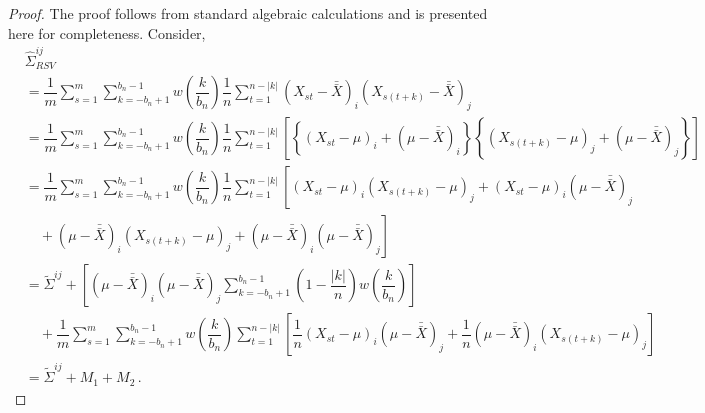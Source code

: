 \documentclass[11pt]{article}
\theoremstyle{remark}
\begin{document}
\begin{proof}
The proof follows from standard algebraic calculations and is presented here for completeness. Consider,
\begin{align*}
&\hat{\Sigma}_{RSV}^{ij} \\
&= \dfrac{1}{m}\sum_{s=1}^{m} \sum_{k=-b_n+1}^{b_n-1}w\left(\dfrac{k}{b_n}\right)\dfrac{1}{n}\sum_{t=1}^{n-|k|} \left(X_{st}-\bar{\bar{X}} \right)_i \left(X_{s(t+k)}-\bar{\bar{X}} \right)_j\\
&= \dfrac{1}{m}\sum_{s=1}^{m}\sum_{k=-b_n+1}^{b_n-1}w\left(\dfrac{k}{b_n}\right)\dfrac{1}{n}\sum_{t=1}^{n-|k|} \left[  \left\{\left(X_{st}-\mu \right)_i + \left(\mu-\bar{\bar{X}} \right)_i \right \}  \left\{ \left(X_{s(t+k)}-\mu \right)_j + \left(\mu-\bar{\bar{X}} \right)_j \right \} \right]\\
&= \dfrac{1}{m}\sum_{s=1}^{m}\sum_{k=-b_n+1}^{b_n-1}w\left(\dfrac{k}{b_n}\right)\dfrac{1}{n}\sum_{t=1}^{n-|k|}  \left[ \left(X_{st}-\mu \right)_i  \left(X_{s(t+k)}-\mu \right)_j+  \left(X_{st} - \mu \right)_i    \left(\mu - \bar{\bar{X}} \right)_j \right. \\  
& \quad + \left. \left(\mu-\bar{\bar{X}} \right)_i  \left(X_{s(t+k)}-\mu \right)_j + \left(\mu-\bar{\bar{X}} \right)_i  \left(\mu-\bar{\bar{X}}  \right)_j  \right]\\
& = \tilde{\Sigma}^{ij} + \left[(\mu-\bar{\bar{X}})_i(\mu-\bar{\bar{X}})_j\sum_{k=-b_n+1}^{b_n-1}\left(1-\dfrac{|k|}{n}\right)w\left(\dfrac{k}{b_n}\right)\right] \\ 
& \quad  + \dfrac{1}{m}\sum_{s=1}^{m}\sum_{k=-b_n+1}^{b_n-1}  w\left(\dfrac{k}{b_n}\right)\sum_{t=1}^{n-|k|}  \left[\dfrac{1}{n} \left(X_{st} - \mu \right)_i \left(\mu - \bar{\bar{X}} \right)_j + \dfrac{1}{n} \left(\mu-\bar{\bar{X}} \right)_i  \left(X_{s(t+k)}-\mu \right)_j \right] \\ 
& = \tilde{\Sigma}^{ij} + M_1 + M_2\,.
\end{align*}


\end{proof}
\end{document}
